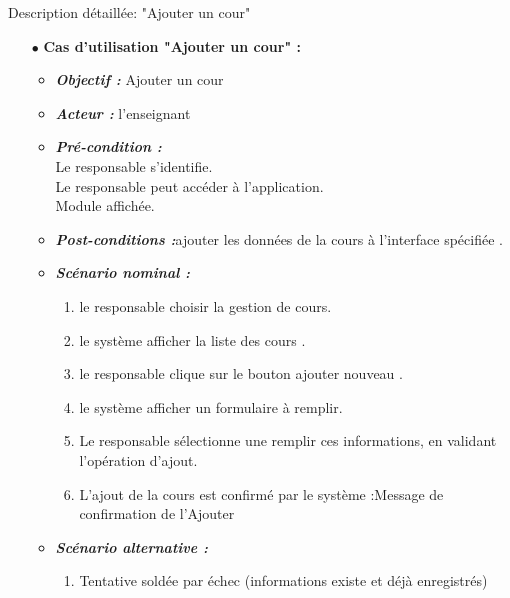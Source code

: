 {\Large \color{cyan} Description détaillée: "Ajouter un cour"}
\begin{itemize}
	\item[$\bullet$] \textbf{Cas d’utilisation "Ajouter un cour" :} 
	\medskip
	\begin{itemize}
		\item \textit{\textbf{Objectif :}} Ajouter un cour	
		\item \textit{\textbf{Acteur :}}  l'enseignant
		\item \textit{\textbf{Pré-condition  :}} \\
		Le responsable s’identifie.\\
		Le responsable peut accéder à l’application.\\
		Module affichée.
		\item \textit{\textbf{Post-conditions   :}}ajouter les données de la cours à l'interface spécifiée .
		\item \textit{\textbf{Scénario nominal :}}
		\begin{enumerate}
			\item le responsable choisir la gestion de cours.
			\item le système afficher la liste des cours .
			\item le responsable clique sur le bouton ajouter nouveau .
			
			\item le système afficher un formulaire à remplir. 
			\item  Le responsable sélectionne une remplir ces
			informations, en validant l’opération d’ajout. 
			\item L’ajout de la cours est confirmé par le système :Message de confirmation de l'Ajouter  

		\end{enumerate}
		\item \textit{\textbf{Scénario alternative :}}
		\begin{enumerate}
			\item Tentative soldée par échec (informations existe et
			déjà enregistrés)
		\end{enumerate}
	\end{itemize}
\end{itemize}	
\bigskip


